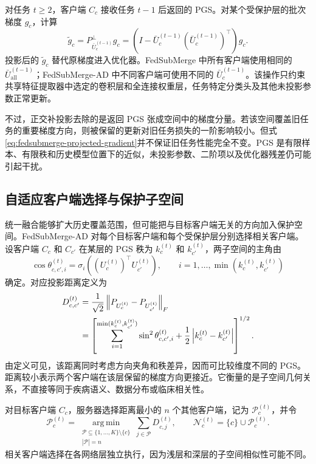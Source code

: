 对任务 $t\geq2$，客户端 $C_c$ 接收任务 $t-1$ 后返回的 PGS。对某个受保护层的批次梯度 $g_c$，计算
\begin{equation}
\widetilde g_c
=
P_{\bar U_c^{(t-1)}}^{\perp}g_c
=
\left(I-\bar U_c^{(t-1)}(\bar U_c^{(t-1)})^{\top}\right)g_c.
\label{eq:fedsubmerge-projected-gradient}
\end{equation}
投影后的 $\widetilde g_c$ 替代原梯度进入优化器。FedSubMerge 中所有客户端使用相同的 $\bar U_{\mathrm{all}}^{(t-1)}$；FedSubMerge-AD 中不同客户端可使用不同的 $\bar U_c^{(t-1)}$。该操作只约束共享特征提取器中选定的卷积层和全连接权重层，任务特定分类头及其他未投影参数正常更新。

不过，正交补投影去除的是返回 PGS 张成空间中的梯度分量。若该空间覆盖旧任务的重要梯度方向，则被保留的更新对旧任务损失的一阶影响较小。但式\eqref{eq:fedsubmerge-projected-gradient}并不保证旧任务性能完全不变。PGS 是有限样本、有限秩和历史模型位置下的近似，未投影参数、二阶项以及优化器残差仍可能引起干扰。

\subsection{自适应客户端选择与保护子空间}
\label{subsec:fedsubmerge-personalized-subspace}
\label{subsec:fedsubmerge-adaptive-selection}

统一融合能够扩大历史覆盖范围，但可能把与目标客户端无关的方向加入保护空间。FedSubMerge-AD 对每个目标客户端和每个受保护层分别选择相关客户端。设客户端 $C_c$ 和 $C_{c'}$ 在某层的 PGS 秩为 $k_c^{(t)}$ 和 $k_{c'}^{(t)}$，两子空间的主角由
\begin{equation}
\cos\theta_{c,c',i}^{(t)}
=
\sigma_i\!\left((U_c^{(t)})^{\top}U_{c'}^{(t)}\right),
\qquad
 i=1,\ldots,\min(k_c^{(t)},k_{c'}^{(t)})
\label{eq:fedsubmerge-principal-angle}
\end{equation}
确定。对应投影距离定义为
\begin{align}
D_{c,c'}^{(t)}
&=
\frac{1}{\sqrt{2}}
\left\|P_{U_c^{(t)}}-P_{U_{c'}^{(t)}}\right\|_F
\notag\\
&=
\left[
\sum_{i=1}^{\min(k_c^{(t)},k_{c'}^{(t)})}
\sin^2\theta_{c,c',i}^{(t)}
+
\frac{1}{2}\left|k_c^{(t)}-k_{c'}^{(t)}\right|
\right]^{1/2}.
\label{eq:fedsubmerge-subspace-distance}
\end{align}
由定义可见，该距离同时考虑方向夹角和秩差异，因而可比较维度不同的 PGS。距离较小表示两个客户端在该层保留的梯度方向更接近。它衡量的是子空间几何关系，不直接等同于疾病语义、数据分布或临床相关性。

对目标客户端 $C_c$，服务器选择距离最小的 $n$ 个其他客户端，记为 $\mathcal{P}_c^{(t)}$，并令
\begin{equation}
\mathcal{P}_c^{(t)}
=
\operatorname*{arg\,min}_{
\substack{\mathcal{P}\subseteq\{1,\ldots,K\}\setminus\{c\}\\|\mathcal{P}|=n}}
\sum_{j\in\mathcal{P}}D_{c,j}^{(t)},
\qquad
\mathcal{N}_c^{(t)}=\{c\}\cup\mathcal{P}_c^{(t)}.
\label{eq:fedsubmerge-neighbor-set}
\end{equation}
相关客户端选择在各网络层独立执行，因为浅层和深层的子空间相似性可能不同。


